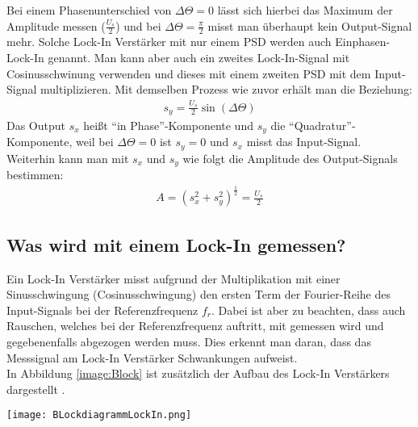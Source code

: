 Bei einem Phasenunterschied von $\Delta\Theta = 0$ lässt sich hierbei das Maximum der Amplitude messen ($\frac{U_s}{2}$) und bei $\Delta\Theta = \frac{\pi}{2}$ misst man überhaupt kein Output-Signal mehr. Solche Lock-In Verstärker mit nur einem PSD werden auch Einphasen-Lock-In genannt. Man kann aber auch ein zweites Lock-In-Signal mit Cosinusschwinung verwenden und dieses mit einem zweiten PSD mit dem Input-Signal multiplizieren. Mit demselben Prozess wie zuvor erhält man die Beziehung:
\begin{gather}
    s_{y} = \frac{U_s}{2} \sin(\Delta\Theta) 
\end{gather} 
Das Output $s_x$ heißt \enquote{in Phase}-Komponente und $s_y$ die \enquote{Quadratur}-Komponente, weil bei $\Delta\Theta = 0$ ist $s_y = 0$ und $s_x$ misst das Input-Signal.\\

Weiterhin kann man mit $s_x$ und $s_y$ wie folgt die Amplitude des Output-Signals bestimmen:
\begin{gather}
    A = (s_x^2 + s_y^2)^{\frac{1}{2}} = \frac{U_s}{2}
\end{gather}
\subsection*{Was wird mit einem Lock-In gemessen?}
Ein Lock-In Verstärker misst aufgrund der Multiplikation mit einer Sinusschwingung (Cosinusschwingung) den ersten Term der Fourier-Reihe des Input-Signals bei der Referenzfrequenz $f_r$. Dabei ist aber zu beachten, dass auch Rauschen, welches bei der Referenzfrequenz auftritt, mit gemessen wird und gegebenenfalls abgezogen werden muss. Dies erkennt man daran, dass das Messsignal am Lock-In Verstärker Schwankungen aufweist.\\ In Abbildung \ref{image:Block} ist zusätzlich der Aufbau des Lock-In Verstärkers dargestellt \citep{lockin}.
\newpage
\begin{center}
    \texttt{[image: BLockdiagrammLockIn.png]}
    \label{image:Block}
\end{center}

\newpage

